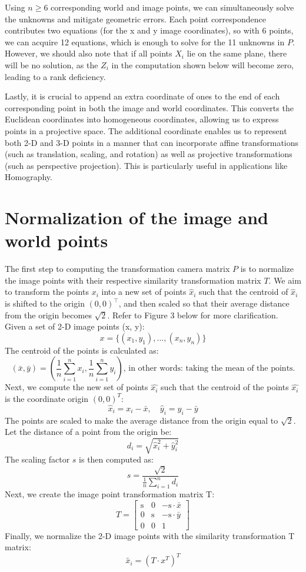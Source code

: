 \documentclass[12pt]{article}
\begin{document}
Using \( n \geq 6 \) corresponding world and image points, we can simultaneously solve the unknowns and mitigate geometric errors. Each point correspondence contributes two equations (for the x and y image coordinates), so with 6 points, we can acquire 12 equations, which is enough to solve for the 11 unknowns in \( P \). However, we should also note that if all points \( X_i \) lie on the same plane, there will be no solution, as the \( Z_i \) in the computation shown below will become zero, leading to a rank deficiency.

Lastly, it is crucial to append an extra coordinate of ones to the end of each corresponding point in both the image and world coordinates. This converts the Euclidean coordinates into homogeneous coordinates, allowing us to express points in a projective space. The additional coordinate enables us to represent both 2-D and 3-D points in a manner that can incorporate affine transformations (such as translation, scaling, and rotation) as well as projective transformations (such as perspective projection). This is particularly useful in applications like Homography.

\section{Normalization of the image and world points}
The first step to computing the transformation camera matrix \( P \) is to normalize the image points with their respective similarity transformation matrix \( T\). We aim to transform the points \( x_i \) into a new set of points \( \hat{x}_i \) such that the centroid of \( \hat{x}_i \) is shifted to the origin \( (0, 0)^\top \), and then scaled so that their average distance from the origin becomes \( \sqrt{2} \). Refer to Figure 3 below for more clarification. \\

\noindent Given a set of 2-D image points (x, y):
\[
    x = \{(x_1, y_1), ..., (x_n, y_n)\}
\]
The centroid of the points is calculated as:
\[
        (\bar{x}, \bar{y}) = ( \frac{1}{n}\sum_{i=1}^{n} x_i,  \frac{1}{n}\sum_{i=1}^{n} y_i)
        \text{, in other words: taking the mean of the points.}
\]
Next, we compute the new set of points \( \hat{x_i} \) such that the centroid of the points \( \hat{x_i} \) is the coordinate origin \( (0, 0)^T \):
\[
    \hat{x}_i = x_i - \bar{x}, \quad \hat{y}_i = y_i - \bar{y}
\]
The points are scaled to make the average distance from the origin equal to \( \sqrt{2} \). Let the distance of a point from the origin be:
\[
    d_i = \sqrt{\hat{x}_i^2 + \hat{y}_i^2}
\]
The scaling factor \( s \) is then computed as:
\[
    s = \frac{\sqrt{2}}{\frac{1}{n} \sum_{i=1}^{n} d_i}
\]
Next, we create the image point transformation matrix T:
\[
T = \begin{bmatrix}
\text{s} & 0 & -\text{s} \cdot \bar{x} \\
0 & \text{s} & -\text{s} \cdot \bar{y} \\
0 & 0 & 1
\end{bmatrix}
\]
Finally, we normalize the 2-D image points with the similarity transformation T matrix:
\[
\tilde{x_i} = (T \cdot x^T)^T
\]
\end{document}

